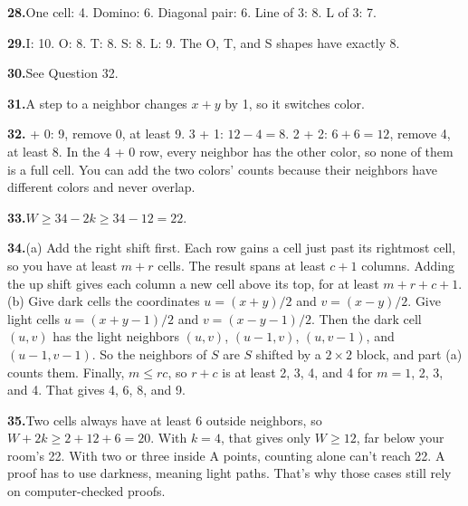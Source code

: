 \documentclass[11pt]{article}
\newcommand\ans[1]{\par\textbf{\color{wall}#1.}\enspace}
\begin{document}
\ans{28}One cell: 4. Domino: 6. Diagonal pair: 6. Line of 3: 8. L of 3: 7.
\ans{29}I: 10. O: 8. T: 8. S: 8. L: 9. The O, T, and S shapes have exactly 8.
\ans{30}See Question 32.
\ans{31}A step to a neighbor changes $x + y$ by 1, so it switches color.
\ans{32}4 + 0: 9, remove 0, at least 9. 3 + 1: $12 - 4 = 8$. 2 + 2: $6 + 6 = 12$, remove 4, at least 8. In the 4 + 0 row, every neighbor has the other color, so none of them is a full cell. You can add the two colors' counts because their neighbors have different colors and never overlap.
\ans{33}$W \ge 34 - 2k \ge 34 - 12 = 22$.
\ans{34}(a) Add the right shift first. Each row gains a cell just past its rightmost cell, so you have at least $m + r$ cells. The result spans at least $c + 1$ columns. Adding the up shift gives each column a new cell above its top, for at least $m + r + c + 1$. (b) Give dark cells the coordinates $u = (x + y)/2$ and $v = (x - y)/2$. Give light cells $u = (x + y - 1)/2$ and $v = (x - y - 1)/2$. Then the dark cell $(u, v)$ has the light neighbors $(u, v)$, $(u - 1, v)$, $(u, v - 1)$, and $(u - 1, v - 1)$. So the neighbors of $S$ are $S$ shifted by a $2 \times 2$ block, and part (a) counts them. Finally, $m \le rc$, so $r + c$ is at least 2, 3, 4, and 4 for $m = 1$, 2, 3, and 4. That gives 4, 6, 8, and 9.
\ans{35}Two cells always have at least 6 outside neighbors, so $W + 2k \ge 2 + 12 + 6 = 20$. With $k = 4$, that gives only $W \ge 12$, far below your room's 22. With two or three inside A points, counting alone can't reach 22. A proof has to use darkness, meaning light paths. That's why those cases still rely on computer-checked proofs.
\end{document}
